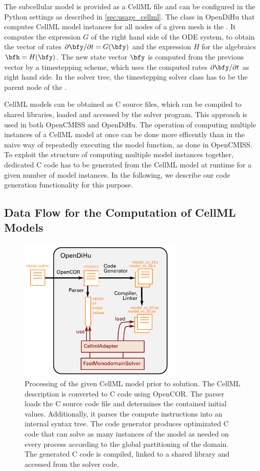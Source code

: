 The subcellular model is provided as a CellML file and can be configured in the Python settings as described in \cref{sec:usage_cellml}.
The class in OpenDiHu that computes CellML model instances for all nodes of a given mesh is the . It computes the expression $G$ of the right hand side of the ODE system, to obtain the vector of rates $\partial \bfy / \partial t = G(\bfy)$ and the expression $H$ for the algebraics $\bfh=H(\bfy)$. The new state vector $\bfy$ is computed from the previous vector by a timestepping scheme, which uses the computed rates $\partial \bfy / \partial t$ as right hand side. In the solver tree, the timestepping solver class has to be the parent node of the .

CellML models can be obtained as C source files, which can be compiled to shared libraries, loaded and accessed by the solver program. This approach is used in both OpenCMISS and OpenDiHu.
The operation of computing multiple instances of a CellML model at once can be done more efficently than in the naive way of repeatedly executing the model function, as done in OpenCMISS. To exploit the structure of computing multiple model instances together, dedicated C code has to be generated from the CellML model at runtime for a given number of model instances.
In the following, we describe our code generation functionality for this purpose.

\subsection{Data Flow for the Computation of CellML Models}

\begin{figure}%
  \centering%
  \includegraphics[width=0.7\textwidth]{images/implementation/cellml_scheme.pdf}%
  \caption{Processing of the given CellML model prior to solution. The CellML description is converted to C code using OpenCOR. The parser loads the C source code file and determines the contained initial values. Additionally, it parses the compute instructions into an internal syntax tree. The code generator produces optimizated C code that can solve as many instances of the model as needed on every process according to the global partitioning of the domain. The generated C code is compiled, linked to a shared library and accessed from the solver code.}
  \label{fig:cellml_scheme}%
\end{figure}%

